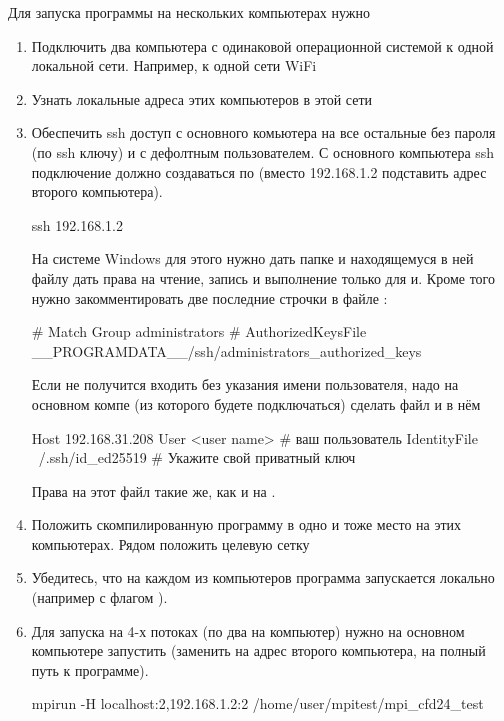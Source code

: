 Для запуска программы на нескольких компьютерах нужно
\begin{enumerate}
\item Подключить два компьютера с одинаковой операционной системой к одной локальной сети. Например, к одной сети WiFi
\item Узнать локальные адреса этих компьютеров в этой сети
\item Обеспечить ssh доступ с основного комьютера на все остальные без пароля (по ssh ключу) и с дефолтным пользователем.
      С основного компьютера ssh подключение должно создаваться по (вместо 192.168.1.2 подставить адрес второго компьютера).
\begin{bashcode}
ssh 192.168.1.2
\end{bashcode}
На системе Windows для этого нужно дать папке 
и находящемуся в ней файлу  дать права на чтение, запись и выполнение только для
 и.
Кроме того нужно закомментировать две последние строчки в файле :
\begin{bashcode}
# Match Group administrators
#       AuthorizedKeysFile __PROGRAMDATA__/ssh/administrators_authorized_keys
\end{bashcode}
Если не получится входить без указания имени пользователя, надо на основном компе (из которого будете подключаться)
сделать файл  и в нём
\begin{bashcode}
Host 192.168.31.208
    User <user name>               # ваш пользователь
    IdentityFile ~/.ssh/id_ed25519 # Укажите свой приватный ключ
\end{bashcode}
Права на этот файл такие же, как и на .

\item Положить скомпилированную программу  в одно и тоже место на этих компьютерах. Рядом положить целевую сетку
\item Убедитесь, что на каждом из компьютеров программа запускается локально (например с флагом ).
\item Для запуска на 4-х потоках (по два на компьютер) нужно на основном компьютере запустить (заменить  на адрес второго компьютера,  на полный путь к программе).
\begin{bashcode}
mpirun -H localhost:2,192.168.1.2:2 /home/user/mpitest/mpi_cfd24_test
\end{bashcode}
\end{enumerate}

